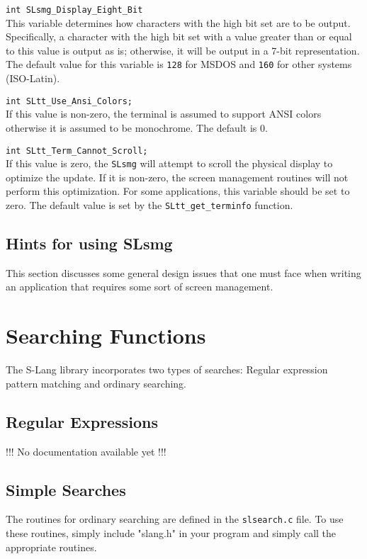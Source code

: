  \verb|int SLsmg_Display_Eight_Bit|\\
  This variable determines how characters with the high bit set are to be
  output.  Specifically, a character with the high bit set with a value
  greater than or equal to this value is output as is; otherwise, it will be
  output in a 7-bit representation.  The default value for this variable is
  \verb|128| for MSDOS and \verb|160| for other systems (ISO-Latin).

  \verb|int SLtt_Use_Ansi_Colors;|\\
  If this value is non-zero, the terminal is assumed to support ANSI colors
  otherwise it is assumed to be monochrome.  The default is 0.
  
  \verb|int SLtt_Term_Cannot_Scroll;|\\
  If this value is zero, the \verb|SLsmg| will attempt to scroll the physical
  display to optimize the update.  If it is non-zero, the screen management
  routines will not perform this optimization.  For some applications, this
  variable should be set to zero.  The default value is set by the
  \verb|SLtt_get_terminfo| function.
  
\subsection{Hints for using SLsmg}

  This section discusses some general design issues that one must face when
  writing an application that requires some sort of screen management.



\section{Searching Functions} %

 The S-Lang library incorporates two types of searches: Regular expression
 pattern matching and ordinary searching.
 
\subsection{Regular Expressions} %

             !!! No documentation available yet !!!


\subsection{Simple Searches} %
 The routines for ordinary searching are defined in the \verb|slsearch.c| file.
 To use these routines, simply include "slang.h" in your program and simply
 call the appropriate routines.
 
